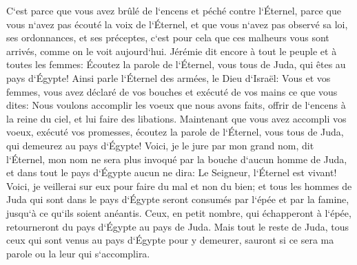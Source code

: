 \verse C`est parce que vous avez brûlé de l`encens et péché contre l`Éternel, parce que vous n`avez pas écouté la voix de l`Éternel, et que vous n`avez pas observé sa loi, ses ordonnances, et ses préceptes, c`est pour cela que ces malheurs vous sont arrivés, comme on le voit aujourd`hui. 
\verse Jérémie dit encore à tout le peuple et à toutes les femmes: Écoutez la parole de l`Éternel, vous tous de Juda, qui êtes au pays d`Égypte! 
\verse Ainsi parle l`Éternel des armées, le Dieu d`Israël: Vous et vos femmes, vous avez déclaré de vos bouches et exécuté de vos mains ce que vous dites: Nous voulons accomplir les voeux que nous avons faits, offrir de l`encens à la reine du ciel, et lui faire des libations. Maintenant que vous avez accompli vos voeux, exécuté vos promesses, 
\verse écoutez la parole de l`Éternel, vous tous de Juda, qui demeurez au pays d`Égypte! Voici, je le jure par mon grand nom, dit l`Éternel, mon nom ne sera plus invoqué par la bouche d`aucun homme de Juda, et dans tout le pays d`Égypte aucun ne dira: Le Seigneur, l`Éternel est vivant! 
\verse Voici, je veillerai sur eux pour faire du mal et non du bien; et tous les hommes de Juda qui sont dans le pays d`Égypte seront consumés par l`épée et par la famine, jusqu`à ce qu`ils soient anéantis. 
\verse Ceux, en petit nombre, qui échapperont à l`épée, retourneront du pays d`Égypte au pays de Juda. Mais tout le reste de Juda, tous ceux qui sont venus au pays d`Égypte pour y demeurer, sauront si ce sera ma parole ou la leur qui s`accomplira. 
